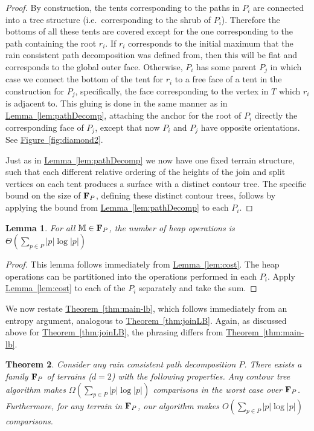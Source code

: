 \documentclass[11pt]{article}
\newtheorem{theorem}{Theorem}[section]
\newtheorem{lemma}[theorem]{Lemma}
\theoremstyle{definition}
\newcommand{\bF}{{\bf F}}
\newcommand{\MM}{\mathbb{M}}
\newcommand{\Fig}[1]{\hyperref[fig:#1]{Figure~\ref*{fig:#1}}} %
\newcommand{\Thm}[1]{\hyperref[thm:#1]{Theorem~\ref*{thm:#1}}} %
\newcommand{\Lem}[1]{\hyperref[lem:#1]{Lemma~\ref*{lem:#1}}} %
\begin{document}
\begin{proof}
 By construction, the tents corresponding to the paths in $P_i$ are connected 
 into a tree structure (i.e.\ corresponding to the shrub of $P_i$).  Therefore the bottoms of all these tents are covered except for the one corresponding 
 to the path containing the root $r_i$.  
 If $r_i$ corresponds to the initial maximum that the rain consistent path decomposition was defined from, then this will be flat and corresponds to the global outer face.
 Otherwise, $P_i$ has some parent $P_j$ in which case we connect the bottom of the tent for $r_i$ to a free face of a tent in the construction for $P_j$, specifically, the face corresponding to the 
 vertex in $T$ which $r_i$ is adjacent to. This gluing is done in the same manner as in \Lem{pathDecomp}, attaching the anchor for the root of $P_i$ directly the corresponding face of $P_j$, except that now $P_i$ and $P_j$ have opposite orientations.  See \Fig{diamond2}.
 
 Just as in \Lem{pathDecomp} we now have one fixed terrain structure, such that each different relative ordering of the heights of the join and split vertices 
 on each tent produces a surface with a distinct contour tree.  The specific bound on the size of $\bF_P$, defining these distinct contour trees, follows by applying the 
 bound from \Lem{pathDecomp} to each $P_i$.
\end{proof}




\begin{lemma}
For all $\MM \in \bF_P$, the number of heap operations is $\Theta(\sum_{p\in P} |p|\log |p|)$
\end{lemma}
\begin{proof}
 This lemma follows immediately from \Lem{cost}.  The heap operations can be partitioned into the
 operations performed in each $P_i$.
 Apply \Lem{cost} to each of the $P_i$ separately and take the sum.
\end{proof}

We now restate \Thm{main-lb}, which follows immediately from an entropy argument, analogous to \Thm{joinLB}.
Again, as discussed above for \Thm{joinLB}, the phrasing differs from \Thm{main-lb}.

\begin{theorem}\label{thm:path-main-lb}
Consider any rain consistent path decomposition $P$. There exists a family $\bF_P$ of terrains ($d=2$) with the following properties.
Any contour tree algorithm makes $\Omega(\sum_{p \in P} |p|\log |p|)$ comparisons in the worst case over $\bF_P$.
Furthermore, for any terrain in $\bF_P$, our algorithm makes $O(\sum_{p \in P} |p|\log |p|)$ comparisons.
\end{theorem}
\end{document}
